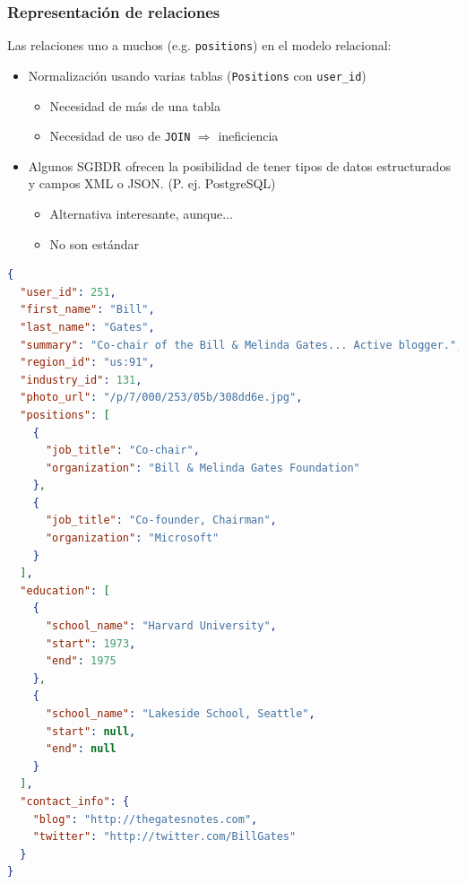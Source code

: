 \begin{frame}
  \frametitle{Representación de relaciones}

  Las relaciones uno a muchos (e.g. {\tt positions}) en el modelo
  relacional:

\begin{itemize}
\item Normalización usando varias tablas ({\tt Positions} con
  {\tt user\_id})
  \begin{itemize}
  \item Necesidad de más de una tabla
  \item Necesidad de uso de {\tt JOIN} $\Rightarrow$ ineficiencia
  \end{itemize}
\item Algunos SGBDR ofrecen la posibilidad de tener tipos de datos
  estructurados y campos XML o JSON. (P. ej. PostgreSQL)
  \begin{itemize}
  \item Alternativa interesante, aunque...
  \item No son estándar
  \end{itemize}
\end{itemize}
\end{frame}

\begin{frame}
\begin{lstlisting}[language=json,basicstyle=\tiny\tt]
{
  "user_id": 251,
  "first_name": "Bill",
  "last_name": "Gates",
  "summary": "Co-chair of the Bill & Melinda Gates... Active blogger.",
  "region_id": "us:91",
  "industry_id": 131,
  "photo_url": "/p/7/000/253/05b/308dd6e.jpg",
  "positions": [
    {
      "job_title": "Co-chair",
      "organization": "Bill & Melinda Gates Foundation"
    },
    {
      "job_title": "Co-founder, Chairman",
      "organization": "Microsoft"
    }
  ],
  "education": [
    {
      "school_name": "Harvard University",
      "start": 1973,
      "end": 1975
    },
    {
      "school_name": "Lakeside School, Seattle",
      "start": null,
      "end": null
    }
  ],
  "contact_info": {
    "blog": "http://thegatesnotes.com",
    "twitter": "http://twitter.com/BillGates"
  }
}
\end{lstlisting}
\end{frame}



